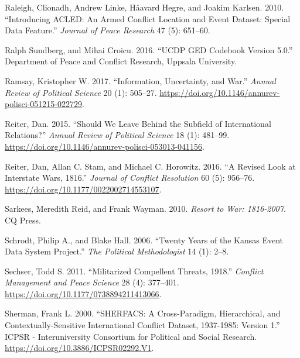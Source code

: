 \documentclass{article}
\newlength{\cslhangindent}
\newlength{\cslentryspacingunit} %
\newenvironment{CSLReferences}[2] %
 {%
  \setlength{\parindent}{0pt}
  \ifodd #1
  \let\oldpar\par
  \def\par{\hangindent=\cslhangindent\oldpar}
  \fi
  \setlength{\parskip}{#2\cslentryspacingunit}
 }%
 {}
\begin{document}
\begin{CSLReferences}{1}{0}
\leavevmode{}%
Raleigh, Clionadh, Andrew Linke, Håavard Hegre, and Joakim Karlsen.
2010. {``Introducing {ACLED}: An Armed Conflict Location and Event
Dataset: Special Data Feature.''} \emph{Journal of Peace Research} 47
(5): 651--60.

\leavevmode{}%
Ralph Sundberg, and Mihai Croicu. 2016. {``{UCDP GED Codebook} Version
5.0.''} {Department of Peace and Conflict Research, Uppsala University}.

\leavevmode{}%
Ramsay, Kristopher W. 2017. {``Information, {Uncertainty}, and {War}.''}
\emph{Annual Review of Political Science} 20 (1): 505--27.
\url{https://doi.org/10.1146/annurev-polisci-051215-022729}.

\leavevmode{}%
Reiter, Dan. 2015. {``Should {We Leave Behind} the {Subfield} of
{International Relations}?''} \emph{Annual Review of Political Science}
18 (1): 481--99.
\url{https://doi.org/10.1146/annurev-polisci-053013-041156}.

\leavevmode{}%
Reiter, Dan, Allan C. Stam, and Michael C. Horowitz. 2016. {``A {Revised
Look} at {Interstate Wars}, 1816.''} \emph{Journal of
Conflict Resolution} 60 (5): 956--76.
\url{https://doi.org/10.1177/0022002714553107}.

\leavevmode{}%
Sarkees, Meredith Reid, and Frank Wayman. 2010. \emph{Resort to War:
1816-2007}. {CQ Press}.

\leavevmode{}%
Schrodt, Philip A., and Blake Hall. 2006. {``Twenty Years of the
{Kansas} Event Data System Project.''} \emph{The Political
Methodologist} 14 (1): 2--8.

\leavevmode{}%
Sechser, Todd S. 2011. {``Militarized {Compellent Threats},
1918.''} \emph{Conflict Management and Peace Science} 28
(4): 377--401. \url{https://doi.org/10.1177/0738894211413066}.

\leavevmode{}%
Sherman, Frank L. 2000. {``{SHERFACS}: {A Cross-Paradigm},
{Hierarchical}, and {Contextually-Sensitive International Conflict
Dataset}, 1937-1985: {Version} 1.''} {ICPSR - Interuniversity Consortium
for Political and Social Research}.
\url{https://doi.org/10.3886/ICPSR02292.V1}.


\end{CSLReferences}
\end{document}
